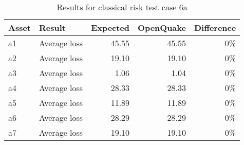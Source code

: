 \begin{table}[htbp]

\centering
\begin{tabular}{ l l r r r }

\hline
\rowcolor{anti-flashwhite}
\bf{Asset} & \bf{Result} & \bf{Expected} & \bf{OpenQuake} & \bf{Difference}\\
\hline
a1 & Average loss & 45.55 & 45.55 & 0\% \\
a2 & Average loss & 19.10 & 19.10 & 0\% \\
a3 & Average loss & 1.06 & 1.04 & 0\% \\
a4 & Average loss & 28.33 & 28.33 & 0\% \\
a5 & Average loss & 11.89 & 11.89 & 0\% \\
a6 & Average loss & 28.29 & 28.29 & 0\% \\
a7 & Average loss & 19.10 & 19.10 & 0\% \\
\hline
\end{tabular}

\caption{Results for classical risk test case 6a}
\label{tab:result-classical-risk-6a}
\end{table}
